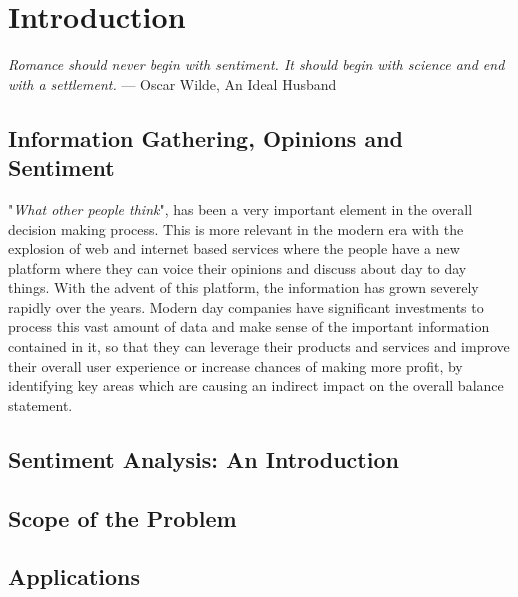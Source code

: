 \chapter{Introduction}\label{chapter:introduction}
\begin{center}
\textit{Romance should never begin with sentiment. It should begin with science and end with a settlement.}
— Oscar Wilde, An Ideal Husband
\end{center}

\section{Information Gathering, Opinions and Sentiment}
"\textit{What other people think}", has been a very important element in the overall decision making process. This is more relevant in the modern era with the explosion of web and internet based services where the people have a new platform where they can voice their opinions and discuss about day to day things. With the advent of this platform, the information has grown severely rapidly over the years. Modern day companies have significant investments to process this vast amount of data and make sense of the important information contained in it, so that they can leverage their products and services and improve their overall user experience or increase chances of making more profit, by identifying key areas which are causing an indirect impact on the overall balance statement.    

\section{Sentiment Analysis: An Introduction}

\section{Scope of the Problem}

\section{Applications}

